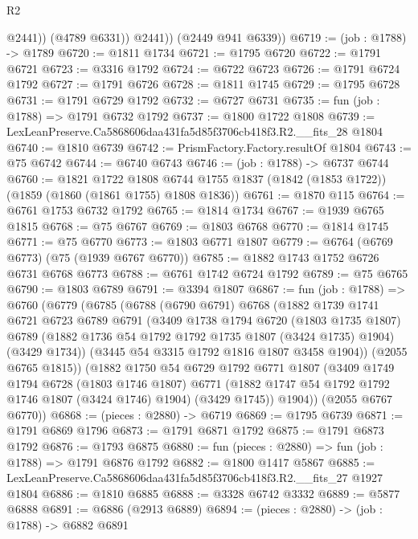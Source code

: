 \begin{lexlean}{R2}
\begin{coremodule}
                @2441))
            (@4789 @6331))
          @2441))
      (@2449 @941 @6339))
@6719 := (job : @1788) -> @1789
@6720 := @1811 @1734
@6721 := @1795 @6720
@6722 := @1791 @6721
@6723 := @3316 @1792
@6724 := @6722 @6723
@6726 := @1791 @6724 @1792
@6727 := @1791 @6726
@6728 := @1811 @1745
@6729 := @1795 @6728
@6731 := @1791 @6729 @1792
@6732 := @6727 @6731
@6735 := fun (job : @1788) => @1791 @6732 @1792
@6737 := @1800 @1722 @1808
@6739 := LexLeanPreserve.Ca5868606daa431fa5d85f3706cb418f3.R2.__fits_28 @1804
@6740 := @1810 @6739
@6742 := PrismFactory.Factory.resultOf @1804
@6743 := @75 @6742
@6744 := @6740 @6743
@6746 := (job : @1788) -> @6737 @6744
@6760 := @1821
    @1722
    @1808
    @6744
    @1755
    @1837
    (@1842 (@1853 @1722))
    (@1859 (@1860 (@1861 @1755) @1808 @1836))
@6761 := @1870 @115
@6764 := @6761 @1753 @6732 @1792
@6765 := @1814 @1734
@6767 := @1939 @6765 @1815
@6768 := @75 @6767
@6769 := @1803 @6768
@6770 := @1814 @1745
@6771 := @75 @6770
@6773 := @1803 @6771 @1807
@6779 := @6764 (@6769 @6773) (@75 (@1939 @6767 @6770))
@6785 := @1882 @1743 @1752 @6726 @6731 @6768 @6773
@6788 := @6761 @1742 @6724 @1792
@6789 := @75 @6765
@6790 := @1803 @6789
@6791 := @3394 @1807
@6867 := fun (job : @1788) =>
  @6760
    (@6779
      (@6785
        (@6788
          (@6790 @6791)
          @6768
          (@1882
            @1739
            @1741
            @6721
            @6723
            @6789
            @6791
            (@3409
              @1738
              @1794
              @6720
              (@1803 @1735 @1807)
              @6789
              (@1882 @1736 @54 @1792 @1792 @1735 @1807 (@3424 @1735) @1904)
              (@3429 @1734))
            (@3445 @54 @3315 @1792 @1816 @1807 @3458 @1904))
          (@2055 @6765 @1815))
        (@1882
          @1750
          @54
          @6729
          @1792
          @6771
          @1807
          (@3409
            @1749
            @1794
            @6728
            (@1803 @1746 @1807)
            @6771
            (@1882 @1747 @54 @1792 @1792 @1746 @1807 (@3424 @1746) @1904)
            (@3429 @1745))
          @1904))
      (@2055 @6767 @6770))
@6868 := (pieces : @2880) -> @6719
@6869 := @1795 @6739
@6871 := @1791 @6869 @1796
@6873 := @1791 @6871 @1792
@6875 := @1791 @6873 @1792
@6876 := @1793 @6875
@6880 := fun (pieces : @2880) => fun (job : @1788) => @1791 @6876 @1792
@6882 := @1800 @1417 @5867
@6885 := LexLeanPreserve.Ca5868606daa431fa5d85f3706cb418f3.R2.__fits_27 @1927 @1804
@6886 := @1810 @6885
@6888 := @3328 @6742 @3332
@6889 := @5877 @6888
@6891 := @6886 (@2913 @6889)
@6894 := (pieces : @2880) -> (job : @1788) -> @6882 @6891

\end{coremodule}
\end{lexlean}
